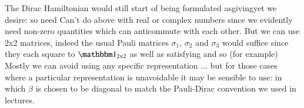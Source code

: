 \answer

The Dirac Hamiltonian would still start of being formulated asgivingyet we desire:
so need
Can't do above with real or complex numbers since we evidently need non-zero quantities which can anticommute with each other.
But we can use 2x2 matrices, indeed the usual Pauli matrices $\sigma_1$, $\sigma_2$ and $\sigma_3$ would suffice since they each square to $\unit_{2\times 2}$ as well as satisfying
and so (for example)
Mostly we can avoid using any specific representation ... but for those cases where a particular representation is unavoidable it may be sensible to use:
in which $\beta$ is chosen to be diagonal to match the Pauli-Dirac convention we used in lectures.

